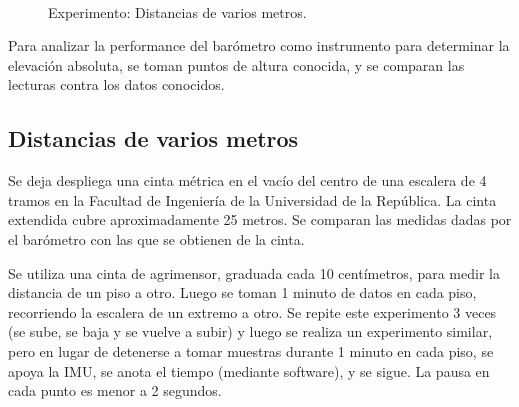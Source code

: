 \documentclass[spanish,12pt,a4paper,titlepage]{report}
\begin{document}
\begin{figure}
\vspace{-70pt}
  \begin{center}
	\\
  \end{center}
  \caption{Experimento: Distancias de varios metros.}
\label{fig:escalera-fing}
\vspace{-40pt}
\end{figure}

Para analizar la performance del barómetro como instrumento para determinar la elevación absoluta, se toman puntos de altura conocida, y se comparan las lecturas contra los datos conocidos.

\subsection{Distancias de varios metros}

Se deja despliega una cinta métrica en el vacío del centro de una escalera de 4 tramos en la Facultad de Ingeniería de la Universidad de la República. La cinta extendida cubre aproximadamente 25 metros. Se comparan las medidas dadas por el barómetro con las que se obtienen de la cinta.

Se utiliza una cinta de agrimensor, graduada cada 10 centímetros, para medir la distancia de un piso a otro. Luego se toman 1 minuto de datos en cada piso, recorriendo la escalera de un extremo a otro. Se repite este experimento 3 veces (se sube, se baja y se vuelve a subir) y luego se realiza un experimento similar, pero en lugar de detenerse a tomar muestras durante 1 minuto en cada piso, se apoya la IMU, se anota el tiempo (mediante software), y se sigue. La pausa en cada punto es menor a 2 segundos.
\end{document}
